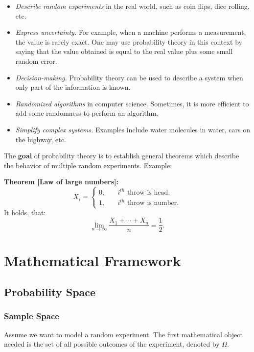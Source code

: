 \documentclass[a4paper]{extarticle}
\begin{document}
\begin{itemize}
    \item \textit{Describe random experiments} in the real world, such as coin flips, dice rolling, etc.
    \item \textit{Express uncertainty.} For example, when a machine performs a measurement, the value is rarely exact. One may use probability theory in this context by saying that the value obtained is equal to the real value plus some small random error.
    \item \textit{Decision-making.} Probability theory can be used to describe a system when only part of the information is known.
    \item \textit{Randomized algorithms} in computer science. Sometimes, it is more efficient to add some randomness to perform an algorithm.
    \item \textit{Simplify complex systems.} Examples include water molecules in water, cars on the highway, etc.
\end{itemize}

The \textbf{goal} of probability theory is to establish general theorems which describe the behavior of multiple random experiments. Example:

\begin{tbox}
    \textbf{Theorem [Law of large numbers]:}
    \[
        X_i = \begin{cases}
            0, \quad &i^{th} \text{ throw is head,} \\ 1, \quad &i^{th} \text{ throw is number.}
        \end{cases}  
    \]
    It holds, that:
    \[
        \lim_{n \to \infty} \frac{X_1 + \cdots + X_n}{n} = \frac{1}{2}.
    \]
\end{tbox}

\section{Mathematical Framework}

\subsection{Probability Space}

\subsubsection{Sample Space}

Assume we want to model a random experiment. The first mathematical object needed is the set of all possible outcomes of the experiment, denoted by \(\Omega\).
\end{document}
